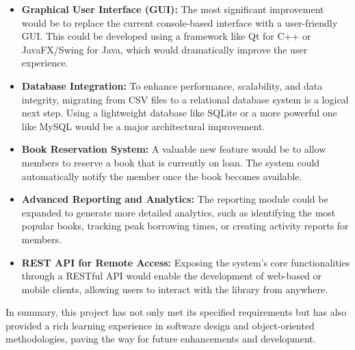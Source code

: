 \begin{itemize}
    \item \textbf{Graphical User Interface (GUI):} The most significant improvement would be to replace the current console-based interface with a user-friendly GUI. This could be developed using a framework like Qt for C++ or JavaFX/Swing for Java, which would dramatically improve the user experience.

    \item \textbf{Database Integration:} To enhance performance, scalability, and data integrity, migrating from CSV files to a relational database system is a logical next step. Using a lightweight database like SQLite or a more powerful one like MySQL would be a major architectural improvement.

    \item \textbf{Book Reservation System:} A valuable new feature would be to allow members to reserve a book that is currently on loan. The system could automatically notify the member once the book becomes available.

    \item \textbf{Advanced Reporting and Analytics:} The reporting module could be expanded to generate more detailed analytics, such as identifying the most popular books, tracking peak borrowing times, or creating activity reports for members.

    \item \textbf{REST API for Remote Access:} Exposing the system's core functionalities through a RESTful API would enable the development of web-based or mobile clients, allowing users to interact with the library from anywhere.
\end{itemize}

In summary, this project has not only met its specified requirements but has also provided a rich learning experience in software design and object-oriented methodologies, paving the way for future enhancements and development.